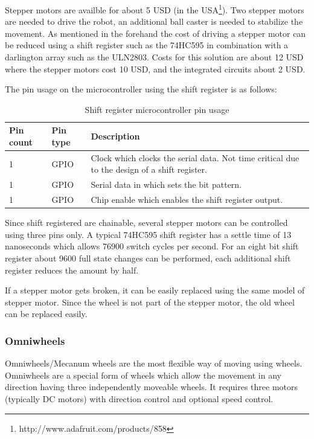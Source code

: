 \documentclass[11pt,a4paper]{article}
\begin{document}
Stepper motors are availble for about 5 USD (in the USA\footnote{http://www.adafruit.com/products/858}). Two stepper motors are needed to drive the robot, an additional ball caster is needed to stabilize the movement. As mentioned in the forehand the cost of driving a stepper motor can be reduced using a shift register such as the 74HC595 in combination with a darlington array such as the ULN2803. Costs for this solution are about 12 USD where the stepper motors cost 10 USD, and the integrated circuits about 2 USD.

The pin usage on the microcontroller using the shift register is as follows:

\begin{table}[h!]
\centering
\begin{tabular}{p{}p{}p{}}
\toprule
Pin count & Pin type & Description \\
\midrule
1 & GPIO & Clock which clocks the serial data. Not time critical due to the design of a shift register.\\
1 & GPIO & Serial data in which sets the bit pattern.\\
1 & GPIO & Chip enable which enables the shift register output.\\
\bottomrule
\end{tabular}
\caption{Shift register microcontroller pin usage}
\label{tbl:74hc595_pin}
\end{table}

Since shift registered are chainable, several stepper motors can be controlled using three pins only. A typical 74HC595 shift register has a settle time of 13 nanoseconds which allows 76900 switch cycles per second. For an eight bit shift register about 9600 full state changes can be performed, each additional shift register reduces the amount by half.

If a stepper motor gets broken, it can be easily replaced using the same model of stepper motor. Since the wheel is not part of the stepper motor, the old wheel can be replaced easily.
\subsubsection{Omniwheels}
Omniwheels/Mecanum wheels are the most flexible way of moving using wheels. Omniwheels are a special form of wheels which allow the movement in any direction having three independently moveable wheels. It requires three motors (typically DC motors) with direction control and optional speed control.
\end{document}
